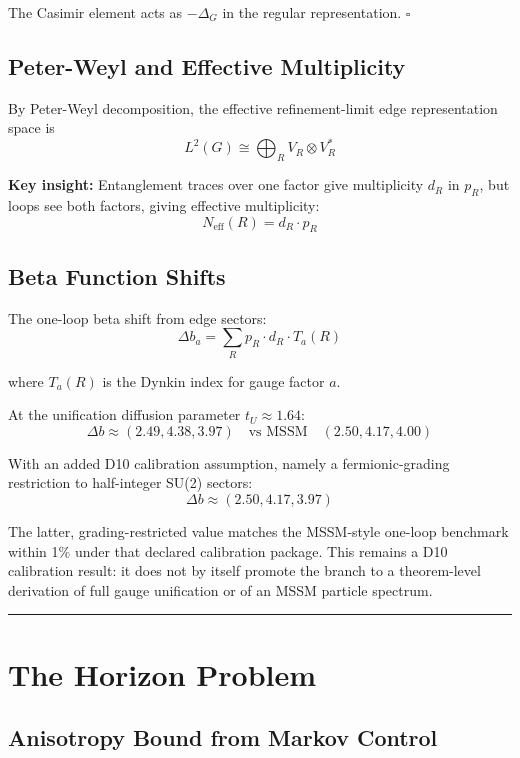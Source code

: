 The Casimir element acts as \(-\Delta_G\) in the regular representation. \(\square\)

\subsection{Peter-Weyl and Effective Multiplicity}\label{54-peter-weyl-and-effective-multiplicity}

By Peter-Weyl decomposition, the effective refinement-limit edge representation space is
\[L^2(G) \cong \bigoplus_R V_R \otimes V_R^*\]

\textbf{Key insight:} Entanglement traces over one factor give multiplicity \(d_R\) in \(p_R\), but loops see both factors, giving effective multiplicity: \[N_{\text{eff}}(R) = d_R \cdot p_R\]

\subsection{Beta Function Shifts}\label{55-beta-function-shifts}

The one-loop beta shift from edge sectors: \[\Delta b_a = \sum_R p_R \cdot d_R \cdot T_a(R)\]

where \(T_a(R)\) is the Dynkin index for gauge factor \(a\).

At the unification diffusion parameter \(t_U \approx 1.64\): \[\Delta b \approx (2.49, 4.38, 3.97) \quad \text{vs MSSM} \quad (2.50, 4.17, 4.00)\]

With an added D10 calibration assumption, namely a fermionic-grading restriction to half-integer SU(2) sectors: \[\Delta b \approx (2.50, 4.17, 3.97)\]

The latter, grading-restricted value matches the MSSM-style one-loop benchmark within 1\% under that declared calibration package. This remains a D10 calibration result: it does not by itself promote the branch to a theorem-level derivation of full gauge unification or of an MSSM particle spectrum.

\begin{center}\rule{0.5\linewidth}{0.5pt}\end{center}

\section{The Horizon Problem}\label{6-the-horizon-problem}

\subsection{Anisotropy Bound from Markov Control}\label{61-anisotropy-bound-from-markov-control}


